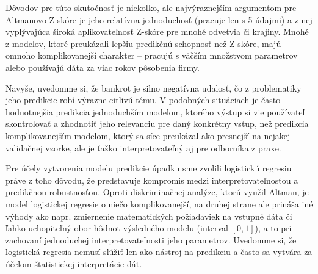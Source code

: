 Dôvodov pre túto skutočnosť je niekoľko, ale najvýraznejším argumentom pre Altmanovo Z-skóre je jeho relatívna jednoduchosť (pracuje len s 5 údajmi)
a z nej vyplývajúca široká aplikovateľnosť Z-skóre pre mnohé odvetvia či krajiny.
Mnohé z modelov, ktoré preukázali lepšiu predikčnú schopnosť než Z-skóre,
majú omnoho komplikovanejší charakter – pracujú s väčším množstvom parametrov alebo používajú dáta za viac rokov pôsobenia firmy.

Navyše, uvedomme si, že bankrot je silno negatívna udalosť, čo z problematiky jeho predikcie robí výrazne citlivú tému.
V podobných situáciach je často hodnotnejšia predikcia jednoduchším modelom,
ktorého výstup si vie používateľ skontrolovať a zhodnotiť jeho relevanciu pre daný konkrétny vstup, než predikcia komplikovanejším modelom,
ktorý sa síce preukázal ako presnejší na nejakej validačnej vzorke, ale je ťažko interpretovateľný aj pre odborníka z praxe.

Pre účely vytvorenia modelu predikcie úpadku sme zvolili logistickú regresiu práve z toho dôvodu,
že predstavuje kompromis medzi interpretovateľnosťou a predikčnou robustnosťou.
Oproti diskriminačnej analýze, ktorú využil Altman, je model logistickej regresie o niečo komplikovanejší,
na druhej strane ale prináša iné výhody ako napr. zmiernenie matematických požiadaviek na vstupné dáta
či ľahko uchopiteľný obor hôdnot výsledného modelu (interval \([0, 1]\)), a to pri zachovaní jednoduchej interpretovateľnosti jeho parametrov.
Uvedomme si, že logistická regresia nemusí slúžiť len ako nástroj na predikciu a často sa vytvára za účelom štatistickej interpretácie dát.